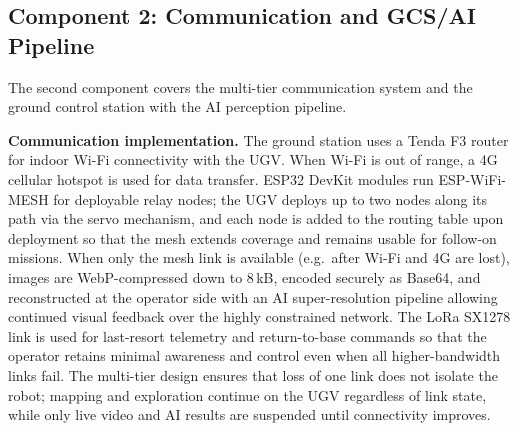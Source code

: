 \subsection{Component 2: Communication and GCS/AI Pipeline}

The second component covers the multi-tier communication system and the ground control station with the AI perception pipeline.

\textbf{Communication implementation.} The ground station uses a Tenda F3 router for indoor Wi-Fi connectivity with the UGV. When Wi-Fi is out of range, a 4G cellular hotspot is used for data transfer. ESP32 DevKit modules run ESP-WiFi-MESH for deployable relay nodes; the UGV deploys up to two nodes along its path via the servo mechanism, and each node is added to the routing table upon deployment so that the mesh extends coverage and remains usable for follow-on missions. When only the mesh link is available (e.g.\ after Wi-Fi and 4G are lost), images are WebP-compressed down to 8\,kB, encoded securely as Base64, and reconstructed at the operator side with an AI super-resolution pipeline allowing continued visual feedback over the highly constrained network. The LoRa SX1278 link is used for last-resort telemetry and return-to-base commands so that the operator retains minimal awareness and control even when all higher-bandwidth links fail. The multi-tier design ensures that loss of one link does not isolate the robot; mapping and exploration continue on the UGV regardless of link state, while only live video and AI results are suspended until connectivity improves.

